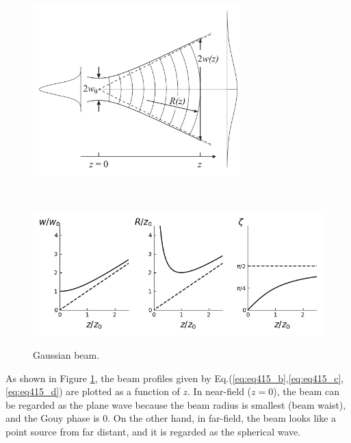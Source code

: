 \begin{figure}[p]
  \begin{minipage}{14cm}
    \centering    
    \includegraphics[width=8cm]{./img_chap4/img415a.png}
    \label{img:img415a}
  \end{minipage}\\
  \begin{minipage}{14cm}
    \centering        
    \includegraphics[width=14cm]{./img_chap4/img415.png}
    \label{img:img415}    
  \end{minipage}
  \caption{Gaussian beam.}
\end{figure}

As shown in Figure \ref{img:img415}, the beam profiles given by Eq.(\ref{eq:eq415_b},\ref{eq:eq415_c},\ref{eq:eq415_d}) are plotted as a function of $z$. In near-field ($z=0$), the beam can be regarded as the plane wave because the beam radius is smallest (beam waist), and the Gouy phase is 0. On the other hand, in far-field, the beam looks like a point source from far distant, and it is regarded as the spherical wave.
